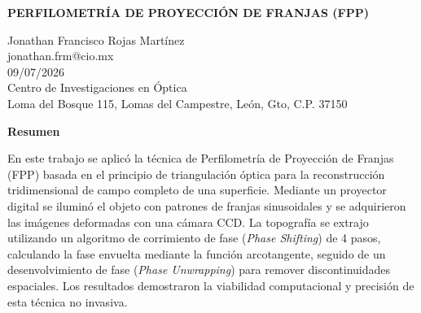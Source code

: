\documentclass[letterpaper]{article}
\begin{document}
	
	\begin{center}
		\Large \textbf{PERFILOMETRÍA DE PROYECCIÓN DE FRANJAS (FPP)}
	\end{center}
	
	\begin{center}
		Jonathan Francisco Rojas Martínez\\
		jonathan.frm@cio.mx\\
		09/07/2026\\
		Centro de Investigaciones en Óptica\\
		Loma del Bosque 115, Lomas del Campestre, León, Gto, C.P. 37150
	\end{center}
	
	\begin{center}
		{\Large \textbf{Resumen}}
	\end{center}
	
	\noindent
	En este trabajo se aplicó la técnica de Perfilometría de Proyección de Franjas (FPP) basada en el principio de triangulación óptica para la reconstrucción tridimensional de campo completo de una superficie. Mediante un proyector digital se iluminó el objeto con patrones de franjas sinusoidales y se adquirieron las imágenes deformadas con una cámara CCD. La topografía se extrajo utilizando un algoritmo de corrimiento de fase (\textit{Phase Shifting}) de 4 pasos, calculando la fase envuelta mediante la función arcotangente, seguido de un desenvolvimiento de fase (\textit{Phase Unwrapping}) para remover discontinuidades espaciales. Los resultados demostraron la viabilidad computacional y precisión de esta técnica no invasiva.
	
\end{document}

